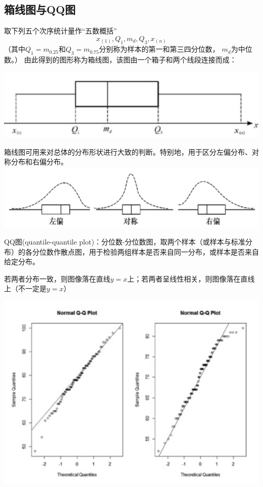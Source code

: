 \documentclass[UTF-8]{ctexbeamer}
\begin{document}
\subsection{箱线图与QQ图}

\begin{frame}
  取下列五个次序统计量作“五数概括”
\[x_{(1)},Q_1,m_d,Q_3,x_{ (n)}\]
（其中$ Q_1=m_{0.25}$和$ Q_3=m_{0.75}$分别称为样本的第一和第三四分位数， $ m_d$为中位数。）
由此得到的图形称为箱线图，该图由一个箱子和两个线段连接而成：

\includegraphics[scale=0.9]{box.png}
\end{frame}
\begin{frame}
  箱线图可用来对总体的分布形状进行大致的判断。特别地，用于区分左偏分布、对称分布和右偏分布。
  \includegraphics[scale=0.5]{lmr.png}
\end{frame}

\begin{frame}
  QQ图(quantile-quantile plot)：分位数-分位数图，取两个样本（或样本与标准分布）的各分位数作散点图，用于检验两组样本是否来自同一分布，或样本是否来自给定分布。

  若两者分布一致，则图像落在直线$y=x$上；若两者呈线性相关，则图像落在直线上（不一定是$y=x$）

  \includegraphics[scale=0.3]{QQ_plot.png}
\end{frame}
\end{document}
